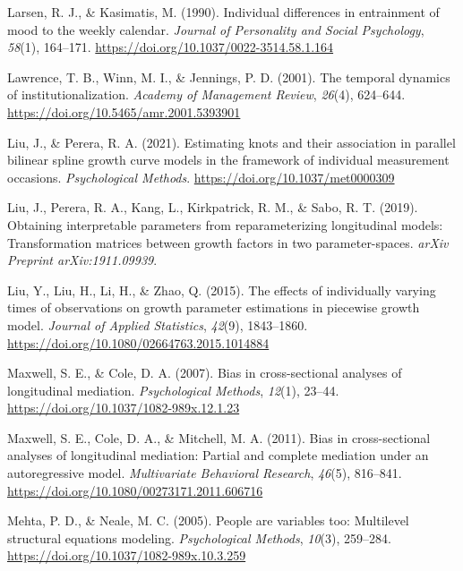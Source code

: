 \documentclass[
  english,
  man,floatsintext]{apa7}
\newlength{\cslhangindent}
\newlength{\cslentryspacingunit} %
\newenvironment{CSLReferences}[2] %
 {%
  \setlength{\parindent}{0pt}
  \ifodd #1
  \let\oldpar\par
  \def\par{\hangindent=\cslhangindent\oldpar}
  \fi
  \setlength{\parskip}{#2\cslentryspacingunit}
 }%
 {}
\begin{document}
\begin{CSLReferences}{1}{0}
\leavevmode{}%
Larsen, R. J., \& Kasimatis, M. (1990). Individual differences in entrainment of mood to the weekly calendar. \emph{Journal of Personality and Social Psychology}, \emph{58}(1), 164--171. \url{https://doi.org/10.1037/0022-3514.58.1.164}

\leavevmode{}%
Lawrence, T. B., Winn, M. I., \& Jennings, P. D. (2001). The temporal dynamics of institutionalization. \emph{Academy of Management Review}, \emph{26}(4), 624--644. \url{https://doi.org/10.5465/amr.2001.5393901}

\leavevmode{}%
Liu, J., \& Perera, R. A. (2021). Estimating knots and their association in parallel bilinear spline growth curve models in the framework of individual measurement occasions. \emph{Psychological Methods}. \url{https://doi.org/10.1037/met0000309}

\leavevmode{}%
Liu, J., Perera, R. A., Kang, L., Kirkpatrick, R. M., \& Sabo, R. T. (2019). Obtaining interpretable parameters from reparameterizing longitudinal models: Transformation matrices between growth factors in two parameter-spaces. \emph{arXiv Preprint arXiv:1911.09939}.

\leavevmode{}%
Liu, Y., Liu, H., Li, H., \& Zhao, Q. (2015). The effects of individually varying times of observations on growth parameter estimations in piecewise growth model. \emph{Journal of Applied Statistics}, \emph{42}(9), 1843--1860. \url{https://doi.org/10.1080/02664763.2015.1014884}

\leavevmode{}%
Maxwell, S. E., \& Cole, D. A. (2007). Bias in cross-sectional analyses of longitudinal mediation. \emph{Psychological Methods}, \emph{12}(1), 23--44. \url{https://doi.org/10.1037/1082-989x.12.1.23}

\leavevmode{}%
Maxwell, S. E., Cole, D. A., \& Mitchell, M. A. (2011). Bias in cross-sectional analyses of longitudinal mediation: Partial and complete mediation under an autoregressive model. \emph{Multivariate Behavioral Research}, \emph{46}(5), 816--841. \url{https://doi.org/10.1080/00273171.2011.606716}

\leavevmode{}%
Mehta, P. D., \& Neale, M. C. (2005). People are variables too: Multilevel structural equations modeling. \emph{Psychological Methods}, \emph{10}(3), 259--284. \url{https://doi.org/10.1037/1082-989x.10.3.259}


\end{CSLReferences}
\end{document}
